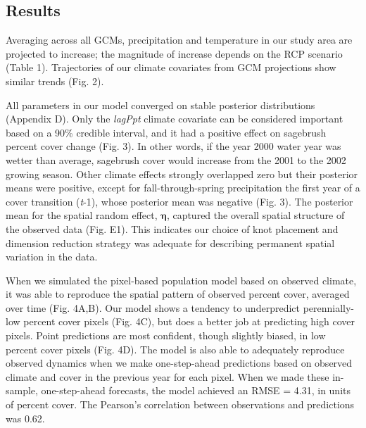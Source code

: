 \documentclass[12pt,]{article}
\begin{document}
\subsection{Results}\label{results}

Averaging across all GCMs, precipitation and temperature in our study
area are projected to increase; the magnitude of increase depends on the
RCP scenario (Table 1). Trajectories of our climate covariates from GCM
projections show similar trends (Fig. 2).

All parameters in our model converged on stable posterior distributions
(Appendix D). Only the \emph{lagPpt} climate covariate can be considered
important based on a 90\% credible interval, and it had a positive
effect on sagebrush percent cover change (Fig. 3). In other words, if
the year 2000 water year was wetter than average, sagebrush cover would
increase from the 2001 to the 2002 growing season. Other climate effects
strongly overlapped zero but their posterior means were positive, except
for fall-through-spring precipitation the first year of a cover
transition (\emph{t}-1), whose posterior mean was negative (Fig. 3). The
posterior mean for the spatial random effect, \(\boldsymbol{\eta}\),
captured the overall spatial structure of the observed data (Fig. E1).
This indicates our choice of knot placement and dimension reduction
strategy was adequate for describing permanent spatial variation in the
data.

When we simulated the pixel-based population model based on observed
climate, it was able to reproduce the spatial pattern of observed
percent cover, averaged over time (Fig. 4A,B). Our model shows a
tendency to underpredict perennially-low percent cover pixels (Fig. 4C),
but does a better job at predicting high cover pixels. Point predictions
are most confident, though slightly biased, in low percent cover pixels
(Fig. 4D). The model is also able to adequately reproduce observed
dynamics when we make one-step-ahead predictions based on observed
climate and cover in the previous year for each pixel. When we made
these in-sample, one-step-ahead forecasts, the model achieved an RMSE =
4.31, in units of percent cover. The Pearson's correlation between
observations and predictions was 0.62.
\end{document}
